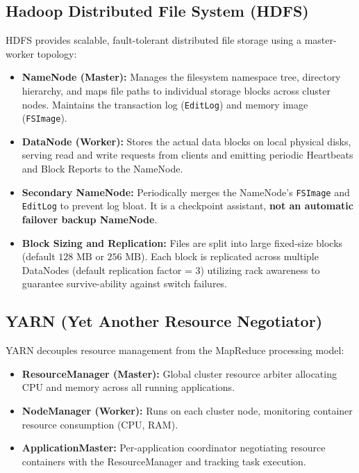 \subsection{Hadoop Distributed File System (HDFS)}
HDFS provides scalable, fault-tolerant distributed file storage using a master-worker topology:
\begin{itemize}
    \item \textbf{NameNode (Master):} Manages the filesystem namespace tree, directory hierarchy, and maps file paths to individual storage blocks across cluster nodes. Maintains the transaction log (\texttt{EditLog}) and memory image (\texttt{FSImage}).
    \item \textbf{DataNode (Worker):} Stores the actual data blocks on local physical disks, serving read and write requests from clients and emitting periodic Heartbeats and Block Reports to the NameNode.
    \item \textbf{Secondary NameNode:} Periodically merges the NameNode's \texttt{FSImage} and \texttt{EditLog} to prevent log bloat. It is a checkpoint assistant, \textbf{not an automatic failover backup NameNode}.
    \item \textbf{Block Sizing and Replication:} Files are split into large fixed-size blocks (default $128\text{ MB}$ or $256\text{ MB}$). Each block is replicated across multiple DataNodes (default replication factor = 3) utilizing rack awareness to guarantee survive-ability against switch failures.
\end{itemize}

\subsection{YARN (Yet Another Resource Negotiator)}
YARN decouples resource management from the MapReduce processing model:
\begin{itemize}
    \item \textbf{ResourceManager (Master):} Global cluster resource arbiter allocating CPU and memory across all running applications.
    \item \textbf{NodeManager (Worker):} Runs on each cluster node, monitoring container resource consumption (CPU, RAM).
    \item \textbf{ApplicationMaster:} Per-application coordinator negotiating resource containers with the ResourceManager and tracking task execution.
\end{itemize}

